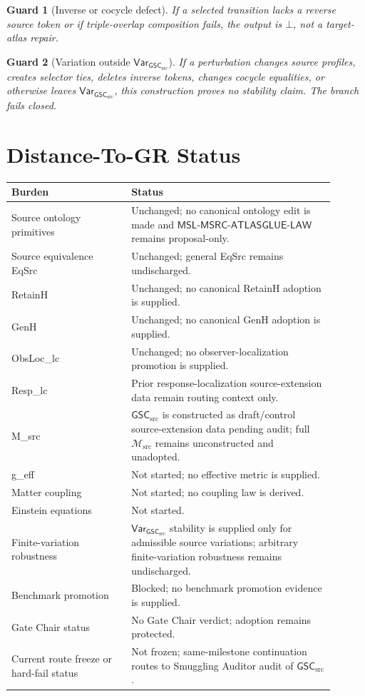 \documentclass[11pt]{article}
\newcommand{\Msrc}{\mathcal{M}_{\mathrm{src}}}
\newcommand{\MSL}{\mathsf{MSL}\mbox{-}\mathsf{MSRC}\mbox{-}\mathsf{ATLASGLUE}\mbox{-}\mathsf{LAW}}
\newcommand{\GSC}{\mathsf{GSC}_{\mathrm{src}}}
\newcommand{\Vargsc}{\mathsf{Var}_{\GSC}}
\newcommand{\Bot}{\bot}
\newtheorem{guard}{Guard}
\begin{document}
\begin{guard}[Inverse or cocycle defect]
If a selected transition lacks a reverse source token or if triple-overlap
composition fails, the output is \(\Bot\), not a target-atlas repair.
\end{guard}

\begin{guard}[Variation outside \(\Vargsc\)]
If a perturbation changes source profiles, creates selector ties, deletes
inverse tokens, changes cocycle equalities, or otherwise leaves \(\Vargsc\),
this construction proves no stability claim. The branch fails closed.
\end{guard}

\section{Distance-To-GR Status}

\begin{center}
\begin{tabular}{p{0.33\linewidth}p{0.57\linewidth}}
\hline
Burden & Status \\
\hline
Source ontology primitives & Unchanged; no canonical ontology edit is made and \(\MSL\) remains proposal-only. \\
Source equivalence EqSrc & Unchanged; general EqSrc remains undischarged. \\
RetainH & Unchanged; no canonical RetainH adoption is supplied. \\
GenH & Unchanged; no canonical GenH adoption is supplied. \\
ObsLoc\_lc & Unchanged; no observer-localization promotion is supplied. \\
Resp\_lc & Prior response-localization source-extension data remain routing context only. \\
M\_src & \(\GSC\) is constructed as draft/control source-extension data pending audit; full \(\Msrc\) remains unconstructed and unadopted. \\
g\_eff & Not started; no effective metric is supplied. \\
Matter coupling & Not started; no coupling law is derived. \\
Einstein equations & Not started. \\
Finite-variation robustness & \(\Vargsc\) stability is supplied only for admissible source variations; arbitrary finite-variation robustness remains undischarged. \\
Benchmark promotion & Blocked; no benchmark promotion evidence is supplied. \\
Gate Chair status & No Gate Chair verdict; adoption remains protected. \\
Current route freeze or hard-fail status & Not frozen; same-milestone continuation routes to Smuggling Auditor audit of \(\GSC\). \\
\hline
\end{tabular}
\end{center}
\end{document}
